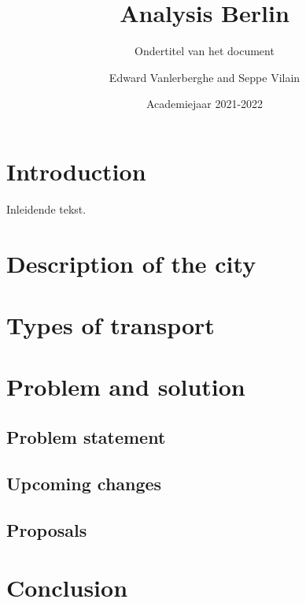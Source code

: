 \documentclass[a4paper,twoside,kul]{kulakreport} %
\title{Analysis Berlin}
\subtitle{Ondertitel van het document}
\author{Edward Vanlerberghe and Seppe Vilain}
\institute{KU Leuven}
\date{Academiejaar 2021-2022}
\begin{document}

\titlepage

\tableofcontents

\chapter*{Introduction}
Inleidende tekst.

\chapter{Description of the city}

\chapter{Types of transport}

	
	
\chapter{Problem and solution}
\section{Problem statement}


\section{Upcoming changes}


\section{Proposals}


\chapter*{Conclusion}



\end{document}
